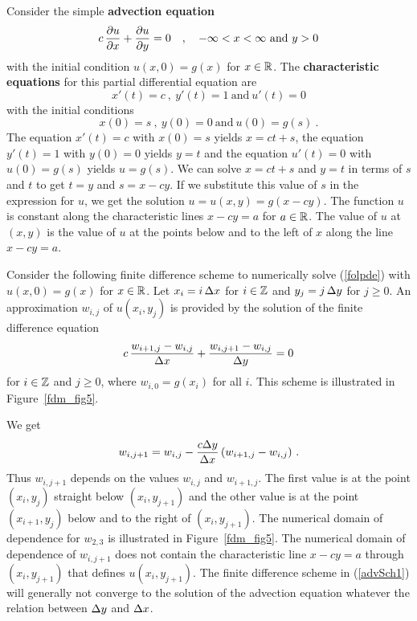 Consider the simple {\bfseries advection equation}
\begin{equation}\label{folpde}
c\, \frac{\partial{u}}{\partial{x}} + \frac{\partial{u}}{\partial{y}} = 0  \quad , \quad -\infty < x <
\infty \ \text{and}\ y > 0
\end{equation}
with the initial condition $u(x,0) = g(x)$ for $x \in \mathbb{R}$.
The {\bfseries characteristic equations} for this partial differential
equation are
\[
x'(t) = c \ , \ y'(t) = 1 \ \text{and} \ u'(t)=0
\]
with the initial conditions
\[
x(0) = s \ , \ y(0) = 0 \ \text{and} \ u(0)=g(s) \ .
\]
The equation $x'(t) = c$ with $x(0)=s$ yields $x = ct + s$,
the equation $y'(t) = 1$ with $y(0)=0$ yields $y = t$ and
the equation $u'(t) = 0$ with $u(0)=g(s)$ yields $u = g(s)$.
We can solve $x = ct+s$ and $y=t$ in terms of $s$ and $t$ to get
$t=y$ and $s= x-cy$.  If we substitute this value of $s$ in the
expression for $u$, we get the solution
$\displaystyle u = u(x,y) = g\left(x-cy\right)$.  The function $u$ is
constant along the characteristic lines $x - c y = a$ for $a \in \mathbb{R}$.
The value of $u$ at $(x,y)$ is the value of $u$ at the points below
and to the left of $x$ along the line $x - cy = a$.

Consider the following finite difference scheme to numerically solve
(\ref{folpde}) with $u(x,0) = g(x)$ for $x \in \mathbb{R}$.   Let
$x_i = i\, \Delta{x}$ for $i \in \mathbb{Z}$ and $y_j = j\, \Delta{y}$ for $j\geq 0$.
An approximation $w_{i,j}$ of $u(x_i,y_j)$ is provided by the solution
of the finite difference equation
\begin{equation} \label{advSch1}
c\, \frac{w_{i+1,j}- w_{i,j}}{\Delta{x}} + \frac{w_{i,j+1} - w_{i,j}}{\Delta{y}}
= 0
\end{equation}
for $i \in \mathbb{Z}$ and $j \geq 0$, where $w_{i,0} = g(x_i)$ for
all $i$.  This scheme is illustrated in Figure~\ref{fdm_fig5}.


We get
\[
w_{i,j+1} = w_{i,j} - \frac{c \Delta{y}}{\Delta{x}} \, (w_{i+1,j} - w_{i,j}) \ .
\]
Thus $w_{i,j+1}$ depends on the values $w_{i,j}$ and $w_{i+1,j}$.  The
first value is at the point $(x_i,y_j)$ straight below
$(x_i,y_{j+1})$ and the other value is at the point $(x_{i+1},y_j)$
below and to the right of $(x_i,y_{j+1})$.  The numerical domain of
dependence for $w_{2,3}$ is illustrated in Figure~\ref{fdm_fig5}.
The numerical domain of dependence of $w_{i,j+1}$ does not contain the
characteristic line $x -cy = a$ through $(x_i,y_{j+1})$ that defines
$u(x_i,y_{j+1})$.  The finite difference scheme in (\ref{advSch1}) will
generally not converge to the solution of the advection equation
whatever the relation between $\Delta{y}$ and $\Delta{x}$.

